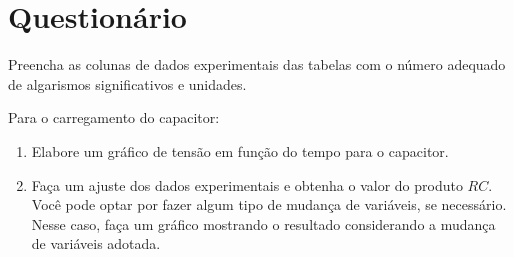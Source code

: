 
\vspace{15mm}

\begin{fullwidth}
\noindent{}
\vspace{5mm}

\noindent{}

\noindent{}

\noindent{}

\noindent{}

\noindent{}
\end{fullwidth}

\vspace{5mm}

\section{Questionário}

\begin{question}[type={exam}]{2}
Preencha as colunas de dados experimentais das tabelas com o número adequado de algarismos significativos e unidades.
\end{question}

\begin{question}[type={exam}]{3}
Para o carregamento do capacitor:
    \begin{enumerate}[label=\roman*.]
        \item Elabore um gráfico de tensão em função do tempo para o capacitor.
        \item Faça um ajuste dos dados experimentais e obtenha o valor do produto $RC$. Você pode optar por fazer algum tipo de mudança de variáveis, se necessário. Nesse caso, faça um gráfico mostrando o resultado considerando a mudança de variáveis adotada.
    \end{enumerate}
\end{question}

